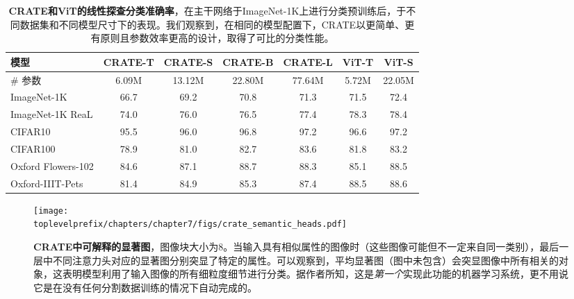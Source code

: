 \documentclass[../../book-main.tex]{subfiles}
\begin{document}
\begin{table}
    \centering
    \begin{tabular}{@{}lcccc|cc@{}}
    \toprule
    \textbf{模型} & CRATE-T  &  CRATE-S & CRATE-B & CRATE-L & { \color{gray} ViT-T} &  { \color{gray}ViT-S } \\ 
    \midrule
    \midrule
     \# 参数 & 6.09M & 13.12M & 22.80M & 77.64M & { \color{gray} 5.72M} & { \color{gray} 22.05M} \\
    \midrule
     ImageNet-1K & 66.7 & 69.2 & 70.8 & 71.3 & { \color{gray} 71.5} & { \color{gray} 72.4} \\
     ImageNet-1K ReaL & 74.0 & 76.0 & 76.5 & 77.4 & { \color{gray} 78.3 } & { \color{gray} 78.4} \\
     CIFAR10 & 95.5 & 96.0 & 96.8 & 97.2 & { \color{gray} 96.6} & { \color{gray} 97.2} \\
     CIFAR100 & 78.9 & 81.0 & 82.7 & 83.6 & { \color{gray} 81.8} & { \color{gray} 83.2}\\
     Oxford Flowers-102 & 84.6 & 87.1 & 88.7 & 88.3 & { \color{gray} 85.1} & { \color{gray} 88.5}\\
     Oxford-IIIT-Pets & 81.4 & 84.9 & 85.3 & 87.4 & { \color{gray} 88.5} & { \color{gray} 88.6} \\
     \bottomrule
    \end{tabular}
    \caption{\small \textbf{CRATE和ViT的线性探查分类准确率}，在主干网络于ImageNet-1K上进行分类预训练后，于不同数据集和不同模型尺寸下的表现。我们观察到，在相同的模型配置下，CRATE以更简单、更有原则且参数效率更高的设计，取得了可比的分类性能。}
    \label{tab:crate_classification_linear_probing}
\end{table}

\begin{figure}
    \centering
    \texttt{[image: \\toplevelprefix/chapters/chapter7/figs/crate\_semantic\_heads.pdf]}
    \caption{\small\textbf{CRATE中可解释的显著图}，图像块大小为\(8\)。当输入具有相似属性的图像时（这些图像可能但不一定来自同一类别），最后一层中不同注意力头对应的显著图分别突显了特定的属性。可以观察到，平均显著图（图中未包含）会突显图像中所有相关的对象，这表明模型利用了输入图像的所有细粒度细节进行分类。据作者所知，这是\textit{第一个}实现此功能的机器学习系统，更不用说它是在没有任何分割数据训练的情况下自动完成的。}
    \label{fig:crate_semantic_heads}
\end{figure}
\end{document}
